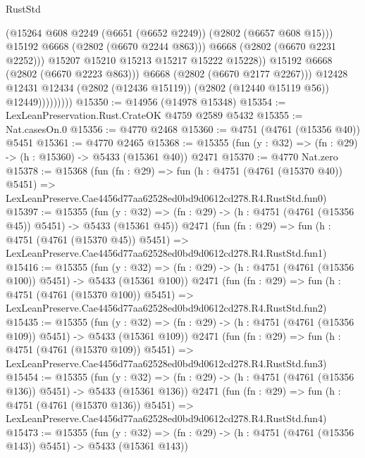 \begin{lexlean}{RustStd}
\begin{coremodule}
                                  (@15264 @608 @2249 (@6651 (@6652 @2249)) (@2802 (@6657 @608 @15)))
                                  @15192
                                  @6668
                                  (@2802 (@6670 @2244 @863)))
                                @6668
                                (@2802 (@6670 @2231 @2252)))
                              @15207
                              @15210
                              @15213
                              @15217
                              @15222
                              @15228))
                          @15192
                          @6668
                          (@2802 (@6670 @2223 @863)))
                        @6668
                        (@2802 (@6670 @2177 @2267)))
                      @12428
                      @12431
                      @12434
                      (@2802 (@12436 @15119))
                      (@2802 (@12440 @15119 @56))
                      @12449)))))))))
@15350 := @14956 (@14978 @15348)
@15354 := LexLeanPreservation.Rust.CrateOK @4759 @2589 @5432
@15355 := Nat.casesOn.{0}
@15356 := @4770 @2468
@15360 := @4751 (@4761 (@15356 @40)) @5451
@15361 := @4770 @2465
@15368 := @15355 (fun (y : @32) => (fn : @29) -> (h : @15360) -> @5433 (@15361 @40)) @2471
@15370 := @4770 Nat.zero
@15378 := @15368
    (fun (fn : @29) =>
    fun (h : @4751 (@4761 (@15370 @40)) @5451) =>
    LexLeanPreserve.Cae4456d77aa62528ed0bd9d0612cd278.R4.RustStd.fun0)
@15397 := @15355
    (fun (y : @32) => (fn : @29) -> (h : @4751 (@4761 (@15356 @45)) @5451) -> @5433 (@15361 @45))
    @2471
    (fun (fn : @29) =>
    fun (h : @4751 (@4761 (@15370 @45)) @5451) =>
    LexLeanPreserve.Cae4456d77aa62528ed0bd9d0612cd278.R4.RustStd.fun1)
@15416 := @15355
    (fun (y : @32) => (fn : @29) -> (h : @4751 (@4761 (@15356 @100)) @5451) -> @5433 (@15361 @100))
    @2471
    (fun (fn : @29) =>
    fun (h : @4751 (@4761 (@15370 @100)) @5451) =>
    LexLeanPreserve.Cae4456d77aa62528ed0bd9d0612cd278.R4.RustStd.fun2)
@15435 := @15355
    (fun (y : @32) => (fn : @29) -> (h : @4751 (@4761 (@15356 @109)) @5451) -> @5433 (@15361 @109))
    @2471
    (fun (fn : @29) =>
    fun (h : @4751 (@4761 (@15370 @109)) @5451) =>
    LexLeanPreserve.Cae4456d77aa62528ed0bd9d0612cd278.R4.RustStd.fun3)
@15454 := @15355
    (fun (y : @32) => (fn : @29) -> (h : @4751 (@4761 (@15356 @136)) @5451) -> @5433 (@15361 @136))
    @2471
    (fun (fn : @29) =>
    fun (h : @4751 (@4761 (@15370 @136)) @5451) =>
    LexLeanPreserve.Cae4456d77aa62528ed0bd9d0612cd278.R4.RustStd.fun4)
@15473 := @15355
    (fun (y : @32) => (fn : @29) -> (h : @4751 (@4761 (@15356 @143)) @5451) -> @5433 (@15361 @143))

\end{coremodule}
\end{lexlean}
